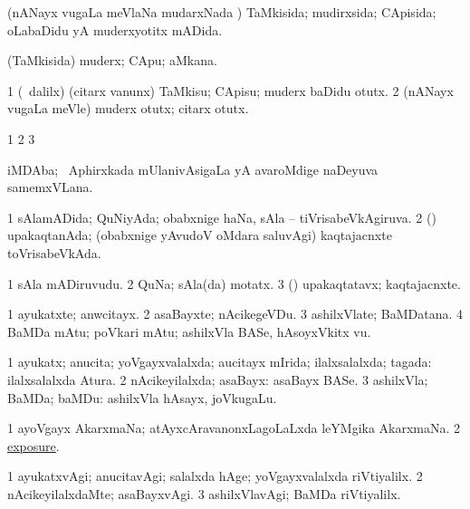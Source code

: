 \bentry
{}
\gl{\gu}
\bmng
(nANayx \mo vugaLa meVlaNa mudarxNada \vi) TaMkisida; mudirxsida; CApisida; oLabaDidu yA muderxyotitx mADida. 
\emng
\eentry

\bentry
{}
\gl{\nA}
\bmng
(TaMkisida) muderx; CApu; aMkana. 
\emng
\eentry

\bentry
{}
\gl{\sakirx}
\bmng
\bnum
\num{1} (\kanmu\ \BUkaq dalilx) (citarx \mo vanunx) TaMkisu; CApisu; muderx baDidu otutx. 
\num{2} (nANayx \mo vugaLa meVle) muderx otutx; citarx otutx. 
\enum
\emng
\eentry

\bentry
{}
\gl{\saMkiSx}
\bmng
\bnum
\num{1}  
\num{2}  
\num{3}  
\enum
\emng
\eentry

\bentry
{}
\gl{\nA}
\bmng
iMDAba; \da\ Aphirxkada mUlanivAsigaLa yA avaroMdige naDeyuva samemxVLana. 
\emng
\eentry

\bentry
{}
\gl{\gu}
\bmng
\bnum
\num{1} sAlamADida; QuNiyAda; obabxnige haNa, sAla -- tiVrisabeVkAgiruva. 
\num{2} (\rUpa) upakaqtanAda; (obabxnige yAvudoV oMdara saluvAgi) kaqtajacnxte toVrisabeVkAda. 
\enum
\emng
\eentry

\bentry
{}
\gl{\nA}
\bmng
\bnum
\num{1} sAla mADiruvudu. 
\num{2} QuNa; sAla(da) motatx. 
\num{3} (\rUpa) upakaqtatavx; kaqtajacnxte. 
\enum
\emng
\eentry

\bentry
{}
\gl{\nA}
\bmng
\bnum
\num{1} ayukatxte; anwcitayx. 
\num{2} asaBayxte; nAcikegeVDu. 
\num{3} ashilxVlate; BaMDatana. 
\num{4} BaMDa mAtu; poVkari mAtu; ashilxVla BASe, hAsoyxVkitx \mo vu. 
\enum
\emng
\eentry

\bentry
{}
\gl{\gu}
\bmng
\bnum
\num{1} ayukatx; anucita; yoVgayxvalalxda; aucitayx mIrida; ilalxsalalxda; tagada:  ilalxsalalxda Atura. 
\num{2} nAcikeyilalxda; asaBayx:  asaBayx BASe. 
\num{3} ashilxVla; BaMDa; baMDu:  ashilxVla hAsayx, joVkugaLu. 
\enum
\emng

\noindent
\gl{\pagu}
\bmng
\bnum
\num{1}  ayoVgayx AkarxmaNa; atAyxcAravanonxLagoLaLxda leYMgika AkarxmaNa. 
\num{2}  \hyperref{kandict_e.pdf}{E}{exposure pagu(2)}{exposure}. 
\enum
\emng
\eentry

\bentry
{}
\gl{\kirxvi}
\bmng
\bnum
\num{1} ayukatxvAgi; anucitavAgi; salalxda hAge; yoVgayxvalalxda riVtiyalilx. 
\num{2} nAcikeyilalxdaMte; asaBayxvAgi. 
\num{3} ashilxVlavAgi; BaMDa riVtiyalilx. 
\enum
\emng
\eentry

